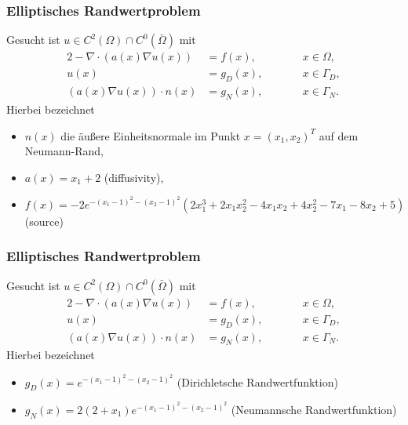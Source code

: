 \documentclass{beamer}
\begin{document}
\begin{frame}[fragile] %
\frametitle{Elliptisches Randwertproblem} %
Gesucht ist $u \in C^{2}(\Omega) \cap  C^{0} (\bar{\Omega})$ mit
\begin{alignat*}{2}
-\nabla \cdot (a(x) \nabla u(x)) &= f(x),      \qquad  && x \in \Omega, \\
u(x)                             &= g_{D}(x),  \qquad  && x \in \Gamma_{D},\\
(a(x)\nabla u(x)) \cdot n(x)     &= g_{N}(x),  \qquad  && x \in \Gamma_{N}.
\end{alignat*}
Hierbei bezeichnet
\begin{itemize}
\item $n(x)$ die äußere Einheitsnormale im Punkt $x = (x_{1},x_{2})^{T}$ auf dem Neumann-Rand,
\item $a(x) = x_{1}+2$ (diffusivity),
\item $f(x) = -2e^{-(x_{1}-1)^{2}-(x_{2}-1)^{2}}(2x_{1}^{3}+2x_{1}x_{2}^{2}-4x_{1}x_{2}+4x_{2}^{2}-7x_{1}-8x_{2}+5)$ (source)
\end{itemize}
\end{frame}

\begin{frame}[fragile] %
\frametitle{Elliptisches Randwertproblem} %
Gesucht ist $u \in C^{2}(\Omega) \cap  C^{0} (\bar{\Omega})$ mit
\begin{alignat*}{2}
-\nabla \cdot (a(x) \nabla u(x)) &= f(x),      \qquad  && x \in \Omega, \\
u(x)                             &= g_{D}(x),  \qquad  && x \in \Gamma_{D},\\
(a(x)\nabla u(x)) \cdot n(x)     &= g_{N}(x),  \qquad  && x \in \Gamma_{N}.
\end{alignat*}
Hierbei bezeichnet
\begin{itemize}
\item $g_{D}(x) = e^{-(x_{1}-1)^{2}-(x_{2}-1)^{2}}$ (Dirichletsche Randwertfunktion)
\item $g_{N}(x) = 2(2+x_{1})e^{-(x_{1}-1)^{2}-(x_{2}-1)^{2}}$ (Neumannsche Randwertfunktion) 
\end{itemize}
\end{frame}
\end{document}
